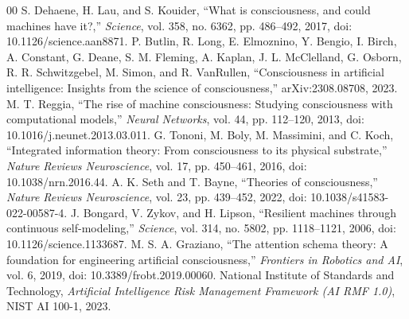 \documentclass[conference]{IEEEtran}
\begin{document}
\balance
\begin{thebibliography}{00}
 S. Dehaene, H. Lau, and S. Kouider, ``What is consciousness, and could machines have it?,'' \emph{Science}, vol. 358, no. 6362, pp. 486--492, 2017, doi: 10.1126/science.aan8871.
 P. Butlin, R. Long, E. Elmoznino, Y. Bengio, I. Birch, A. Constant, G. Deane, S. M. Fleming, A. Kaplan, J. L. McClelland, G. Osborn, R. R. Schwitzgebel, M. Simon, and R. VanRullen, ``Consciousness in artificial intelligence: Insights from the science of consciousness,'' arXiv:2308.08708, 2023.
 M. T. Reggia, ``The rise of machine consciousness: Studying consciousness with computational models,'' \emph{Neural Networks}, vol. 44, pp. 112--120, 2013, doi: 10.1016/j.neunet.2013.03.011.
 G. Tononi, M. Boly, M. Massimini, and C. Koch, ``Integrated information theory: From consciousness to its physical substrate,'' \emph{Nature Reviews Neuroscience}, vol. 17, pp. 450--461, 2016, doi: 10.1038/nrn.2016.44.
 A. K. Seth and T. Bayne, ``Theories of consciousness,'' \emph{Nature Reviews Neuroscience}, vol. 23, pp. 439--452, 2022, doi: 10.1038/s41583-022-00587-4.
 J. Bongard, V. Zykov, and H. Lipson, ``Resilient machines through continuous self-modeling,'' \emph{Science}, vol. 314, no. 5802, pp. 1118--1121, 2006, doi: 10.1126/science.1133687.
 M. S. A. Graziano, ``The attention schema theory: A foundation for engineering artificial consciousness,'' \emph{Frontiers in Robotics and AI}, vol. 6, 2019, doi: 10.3389/frobt.2019.00060.
 National Institute of Standards and Technology, \emph{Artificial Intelligence Risk Management Framework (AI RMF 1.0)}, NIST AI 100-1, 2023.
\end{thebibliography}
\end{document}
